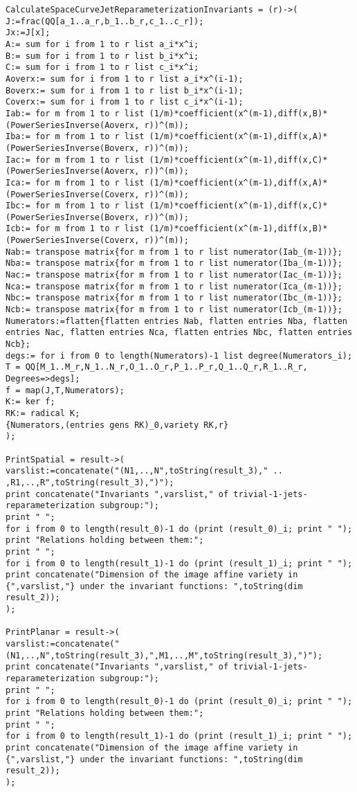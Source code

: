 \documentclass[12pt]{article}
\numberwithin{equation}{section}
\theoremstyle{plain}
\theoremstyle{definition}
\begin{document}
\begin{lstlisting}
CalculateSpaceCurveJetReparameterizationInvariants = (r)->(
J:=frac(QQ[a_1..a_r,b_1..b_r,c_1..c_r]);
Jx:=J[x];
A:= sum for i from 1 to r list a_i*x^i;
B:= sum for i from 1 to r list b_i*x^i;
C:= sum for i from 1 to r list c_i*x^i;
Aoverx:= sum for i from 1 to r list a_i*x^(i-1);
Boverx:= sum for i from 1 to r list b_i*x^(i-1);
Coverx:= sum for i from 1 to r list c_i*x^(i-1);
Iab:= for m from 1 to r list (1/m)*coefficient(x^(m-1),diff(x,B)*(PowerSeriesInverse(Aoverx, r))^(m));
Iba:= for m from 1 to r list (1/m)*coefficient(x^(m-1),diff(x,A)*(PowerSeriesInverse(Boverx, r))^(m));
Iac:= for m from 1 to r list (1/m)*coefficient(x^(m-1),diff(x,C)*(PowerSeriesInverse(Aoverx, r))^(m));
Ica:= for m from 1 to r list (1/m)*coefficient(x^(m-1),diff(x,A)*(PowerSeriesInverse(Coverx, r))^(m));
Ibc:= for m from 1 to r list (1/m)*coefficient(x^(m-1),diff(x,C)*(PowerSeriesInverse(Boverx, r))^(m));
Icb:= for m from 1 to r list (1/m)*coefficient(x^(m-1),diff(x,B)*(PowerSeriesInverse(Coverx, r))^(m));
Nab:= transpose matrix{for m from 1 to r list numerator(Iab_(m-1))};
Nba:= transpose matrix{for m from 1 to r list numerator(Iba_(m-1))};
Nac:= transpose matrix{for m from 1 to r list numerator(Iac_(m-1))};
Nca:= transpose matrix{for m from 1 to r list numerator(Ica_(m-1))};
Nbc:= transpose matrix{for m from 1 to r list numerator(Ibc_(m-1))};
Ncb:= transpose matrix{for m from 1 to r list numerator(Icb_(m-1))};
Numerators:=flatten{flatten entries Nab, flatten entries Nba, flatten entries Nac, flatten entries Nca, flatten entries Nbc, flatten entries Ncb};
degs:= for i from 0 to length(Numerators)-1 list degree(Numerators_i);
T = QQ[M_1..M_r,N_1..N_r,O_1..O_r,P_1..P_r,Q_1..Q_r,R_1..R_r, Degrees=>degs];
f = map(J,T,Numerators);
K:= ker f;
RK:= radical K;
{Numerators,(entries gens RK)_0,variety RK,r}
);

PrintSpatial = result->(
varslist:=concatenate("(N1,..,N",toString(result_3)," .. ,R1,..,R",toString(result_3),")");
print concatenate("Invariants ",varslist," of trivial-1-jets-reparameterization subgroup:");
print " ";
for i from 0 to length(result_0)-1 do (print (result_0)_i; print " ");
print "Relations holding between them:";
print " ";
for i from 0 to length(result_1)-1 do (print (result_1)_i; print " ");
print concatenate("Dimension of the image affine variety in {",varslist,"} under the invariant functions: ",toString(dim result_2));
);

PrintPlanar = result->(
varslist:=concatenate("(N1,..,N",toString(result_3),",M1,..,M",toString(result_3),")");
print concatenate("Invariants ",varslist," of trivial-1-jets-reparameterization subgroup:");
print " ";
for i from 0 to length(result_0)-1 do (print (result_0)_i; print " ");
print "Relations holding between them:";
print " ";
for i from 0 to length(result_1)-1 do (print (result_1)_i; print " ");
print concatenate("Dimension of the image affine variety in {",varslist,"} under the invariant functions: ",toString(dim result_2));
);


\end{lstlisting}
\end{document}
